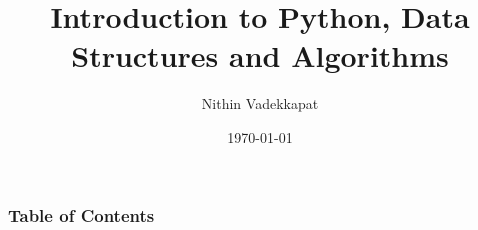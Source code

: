 \documentclass{beamer}
\title{Introduction to Python, Data Structures and Algorithms}
\author{Nithin Vadekkapat}
\date{\today}
\begin{document}
\begin{frame}
    \titlepage
\end{frame}

\begin{frame}
    \frametitle{Table of Contents}
    \tableofcontents
\end{frame}










\end{document}
